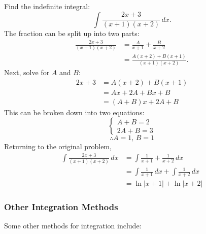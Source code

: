\documentclass[12pt]{article}
\begin{document}
\noindent Find the indefinite integral:
\[ \int \frac{2x+3}{(x+1)(x+2)} \, dx. \]
The fraction can be split up into two parts:
\begin{align*}
    \frac{2x+3}{(x+1)(x+2)} & = \frac{A}{x+1} + \frac{B}{x+2}       \\[6pt]
                            & = \frac{A(x+2) + B(x+1)}{(x+1)(x+2)}.
\end{align*}
Next, solve for $A$ and $B$:
\begin{align*}
    2x+3 & = A(x+2) + B(x+1)  \\
         & = Ax + 2A + Bx + B \\
         & = (A+B)x + 2A + B
\end{align*}
This can be broken down into two equations:
\[ \begin{cases}
        A+B = 2 \\
        2A + B = 3
    \end{cases} \]
\[ \therefore A = 1, \, B = 1 \]
Returning to the original problem,
\begin{align*}
    \int \frac{2x+3}{(x+1)(x+2)} \, dx & = \int \frac{1}{x+1} + \frac{1}{x+2} \, dx            \\[6pt]
                                       & = \int \frac{1}{x+1} \, dx + \int \frac{1}{x+2} \, dx \\
                                       & = \ln|x+1| + \ln|x+2|
\end{align*}

\subsubsection{Other Integration Methods}
\noindent Some other methods for integration include:
\end{document}
